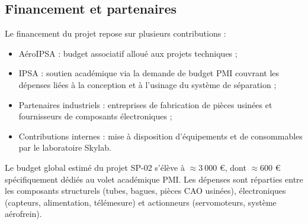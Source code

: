 \subsection{Financement et partenaires}
\label{subsec:financement_partenaires}

Le financement du projet repose sur plusieurs contributions :
\begin{itemize}
    \item AéroIPSA : budget associatif alloué aux projets techniques ;
    \item \acrshort{IPSA} : soutien académique via la demande de budget \acrshort{PMI} couvrant les dépenses liées à la
    conception et à l’usinage du système de séparation ;
    \item Partenaires industriels : entreprises de fabrication de pièces usinées et fournisseurs de composants électroniques ;
    \item Contributions internes : mise à disposition d’équipements et de consommables par le laboratoire \gls{Skylab}.\\
\end{itemize}

Le budget global estimé du projet SP-02 s’élève à $\approx 3\ 000$ €, dont $\approx600$ € spécifiquement dédiés au volet
académique \acrshort{PMI}. Les dépenses sont réparties entre les composants structurels (tubes, bagues, pièces CAO usinées),
électroniques (capteurs, alimentation, télémesure) et actionneurs (servomoteurs, système aérofrein).
